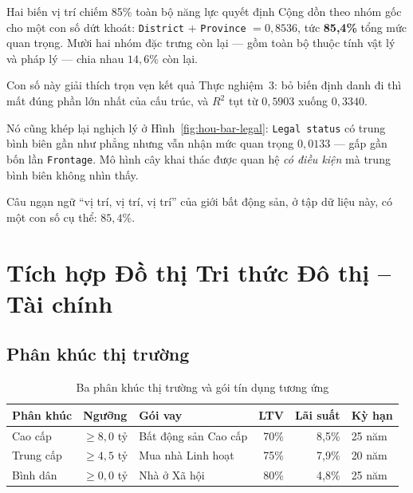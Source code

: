 \begin{phathien}{Hai biến vị trí chiếm 85\% toàn bộ năng lực quyết định}
Cộng dồn theo nhóm gốc cho một con số dứt khoát: \texttt{District} $+$
\texttt{Province} $= 0{,}8536$, tức \textbf{85,4\%} tổng mức quan trọng. Mười
hai nhóm đặc trưng còn lại --- gồm toàn bộ thuộc tính vật lý và pháp lý --- chia
nhau $14{,}6\%$ còn lại.

Con số này giải thích trọn vẹn kết quả Thực nghiệm~3: bỏ biến định danh đi thì
mất đúng phần lớn nhất của cấu trúc, và $R^2$ tụt từ $0{,}5903$ xuống $0{,}3340$.

Nó cũng khép lại nghịch lý ở Hình~\ref{fig:hou-bar-legal}: \texttt{Legal status}
có trung bình biên gần như phẳng nhưng vẫn nhận mức quan trọng $0{,}0133$ --- gấp
gần bốn lần \texttt{Frontage}. Mô hình cây khai thác được quan hệ \emph{có điều
kiện} mà trung bình biên không nhìn thấy.

Câu ngạn ngữ ``vị trí, vị trí, vị trí'' của giới bất động sản, ở tập dữ liệu
này, có một con số cụ thể: $85{,}4\%$.
\end{phathien}

\section{Tích hợp Đồ thị Tri thức Đô thị -- Tài chính}
\label{sec:kg-hou}

\subsection{Phân khúc thị trường}

\begin{table}[H]
\centering
\caption{Ba phân khúc thị trường và gói tín dụng tương ứng}
\label{tab:phankhuc-hou}
\small
\begin{tabularx}{\textwidth}{@{}L{3.2cm}L{1.5cm}L{3.4cm}rrX@{}}
\toprule
\textbf{Phân khúc} & \textbf{Ngưỡng} & \textbf{Gói vay} & \textbf{LTV} & \textbf{Lãi suất} & \textbf{Kỳ hạn} \\
\midrule
Cao cấp    & $\ge 8{,}0$ tỷ & Bất động sản Cao cấp & 70\% & 8{,}5\% & 25 năm \\
Trung cấp  & $\ge 4{,}5$ tỷ & Mua nhà Linh hoạt    & 75\% & 7{,}9\% & 20 năm \\
Bình dân   & $\ge 0{,}0$ tỷ & Nhà ở Xã hội         & 80\% & 4{,}8\% & 25 năm \\
\bottomrule
\end{tabularx}
\end{table}

